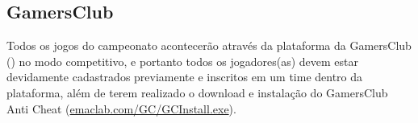 \subsection{GamersClub}

Todos os jogos do campeonato acontecerão através da plataforma da GamersClub () no modo competitivo, e portanto todos os jogadores(as) devem estar devidamente cadastrados previamente e inscritos em um time dentro da plataforma, além de terem realizado o download e instalação do GamersClub Anti Cheat (\url{emaclab.com/GC/GCInstall.exe}).
